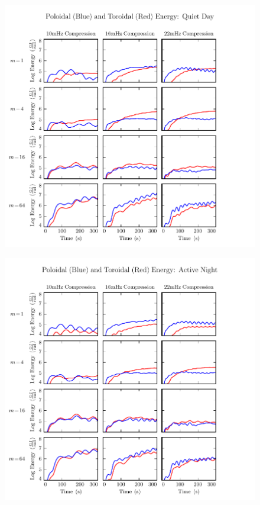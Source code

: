 \begin{figure}[H]
    \centering
    \includegraphics[width=\textwidth]{figures/UP_UT_B_2.pdf}
    \caption[Compression-Driven Poloidal and Toroidal Energy: Quiet Day]{}
    \label{fig_UP_UT_B_2}
\end{figure}

\begin{figure}[H]
    \centering
    \includegraphics[width=\textwidth]{figures/UP_UT_B_3.pdf}
    \caption[Compression-Driven Poloidal and Toroidal Energy: Active Night]{}
    \label{fig_UP_UT_B_3}
\end{figure}





